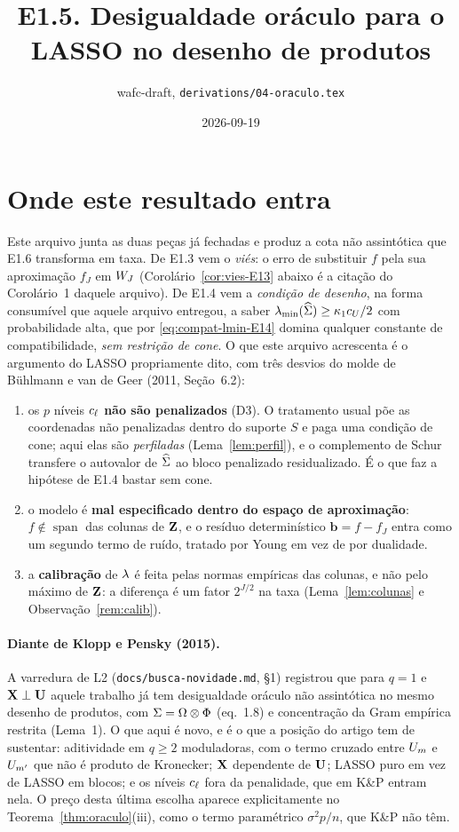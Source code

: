 \documentclass[11pt,a4paper]{article}
\title{E1.5. Desigualdade oráculo para o LASSO no desenho de produtos}
\author{wafc-draft, \texttt{derivations/04-oraculo.tex}}
\date{2026-09-19}
\newcommand{\lmin}{\lambda_{\min}}
\newcommand{\bb}{\mathbf{b}}
\begin{document}
\maketitle

\section*{Onde este resultado entra}

Este arquivo junta as duas peças já fechadas e produz a cota não assintótica
que E1.6 transforma em taxa. De E1.3 vem o \emph{viés}: o erro de substituir
$f$ pela sua aproximação $f_{J}$ em $W_{J}$ (Corolário~\ref{cor:vies-E13} abaixo
é a citação do Corolário~1 daquele arquivo). De E1.4 vem a \emph{condição de
desenho}, na forma consumível que aquele arquivo entregou, a saber
$\lmin(\Gramhat) \ge \kappa_{1}c_{U}/2$ com probabilidade alta, que por
\eqref{eq:compat-lmin-E14} domina qualquer constante de compatibilidade,
\emph{sem restrição de cone}. O que este arquivo acrescenta é o argumento do
LASSO propriamente dito, com três desvios do molde de Bühlmann e van de Geer
(2011, Seção~6.2):

\begin{enumerate}[label=(\alph*), leftmargin=*, nosep]
  \item os $p$ níveis $c_{\ell}$ \textbf{não são penalizados} (D3). O
    tratamento usual põe as coordenadas não penalizadas dentro do suporte $S$
    e paga uma condição de cone; aqui elas são \emph{perfiladas}
    (Lema~\ref{lem:perfil}), e o complemento de Schur transfere o autovalor de
    $\widehat{\Sigma}$ ao bloco penalizado residualizado. É o que faz a hipótese de
    E1.4 bastar sem cone.
  \item o modelo é \textbf{mal especificado dentro do espaço de
    aproximação}: $f \notin \operatorname{span}$ das colunas de $\mathbf{Z}$, e o
    resíduo determinístico $\bb = f - f_{J}$ entra como um segundo termo de
    ruído, tratado por Young em vez de por dualidade.
  \item a \textbf{calibração} de $\lambda$ é feita pelas normas empíricas das
    colunas, e não pelo máximo de $\mathbf{Z}$: a diferença é um fator $2^{J/2}$ na
    taxa (Lema~\ref{lem:colunas} e Observação~\ref{rem:calib}).
\end{enumerate}

\paragraph{Diante de Klopp e Pensky (2015).} A varredura de L2
(\texttt{docs/busca-novidade.md}, §1) registrou que para $q = 1$ e
$\mathbf{X} \perp \mathbf{U}$ aquele trabalho já tem desigualdade oráculo não assintótica no
mesmo desenho de produtos, com $\Sigma = \Omega \otimes \Phi$ (eq.~1.8) e
concentração da Gram empírica restrita (Lema~1). O que aqui é novo, e é o que
a posição do artigo tem de sustentar: aditividade em $q \ge 2$ moduladoras,
com o termo cruzado entre $U_{m}$ e $U_{m'}$ que não é produto de
Kronecker; $\mathbf{X}$ dependente de $\mathbf{U}$; LASSO puro em vez de LASSO em blocos; e
os níveis $c_{\ell}$ fora da penalidade, que em K\&P entram nela. O preço
desta última escolha aparece explicitamente no Teorema~\ref{thm:oraculo}(iii),
como o termo paramétrico $\sigma^{2}p/n$, que K\&P não têm.
\end{document}
